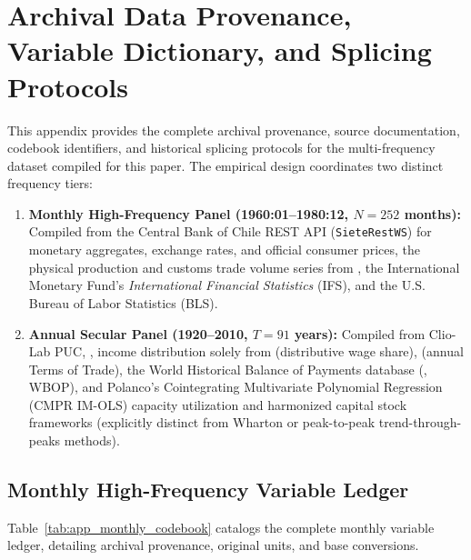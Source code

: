 \section{Archival Data Provenance, Variable Dictionary, and Splicing Protocols}
\label{app:archival_codebook}
\label{app:codebook}

This appendix provides the complete archival provenance, source documentation, codebook identifiers, and historical splicing protocols for the multi-frequency dataset compiled for this paper. The empirical design coordinates two distinct frequency tiers:
\begin{enumerate}[leftmargin=2em]
	\item \textbf{Monthly High-Frequency Panel (1960:01--1980:12, $N=252$ months):} Compiled from the Central Bank of Chile REST API (\texttt{SieteRestWS}) for monetary aggregates, exchange rates, and official consumer prices, the physical production and customs trade volume series from \citet{DiazBahamonde2023}, the International Monetary Fund's \textit{International Financial Statistics} (IFS), and the U.S. Bureau of Labor Statistics (BLS).
	\item \textbf{Annual Secular Panel (1920--2010, $T=91$ years):} Compiled from Clio-Lab PUC, \citet{Braun2000}, income distribution solely from \citet{Astorga2023} (distributive wage share), \citet{DiazLudersWagner2016} (annual Terms of Trade), the World Historical Balance of Payments database (\citealt{NievasPiketty2025}, WBOP), and Polanco's \citeyearpar{Polanco2026} Cointegrating Multivariate Polynomial Regression (CMPR IM-OLS) capacity utilization and harmonized capital stock frameworks (explicitly distinct from Wharton or peak-to-peak trend-through-peaks methods).
\end{enumerate}

\subsection{Monthly High-Frequency Variable Ledger}
\label{app:monthly_ledger}

Table~\ref{tab:app_monthly_codebook} catalogs the complete monthly variable ledger, detailing archival provenance, original units, and base conversions.

